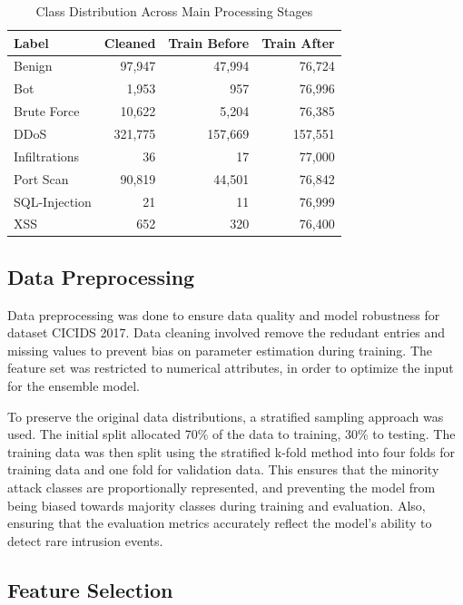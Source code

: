 \documentclass[conference,a4paper]{IEEEtran}
\begin{document}
\begin{table}[htbp]
\caption{Class Distribution Across Main Processing Stages}
\label{tab:class_dist}
\centering
\footnotesize
\renewcommand{\arraystretch}{1.15}
\setlength{\tabcolsep}{3pt}
\begin{tabular}{|l|r|r|r|}
\hline
\textbf{Label} & \textbf{Cleaned} & \textbf{Train Before} & \textbf{Train After} \\
\hline
Benign & 97,947 & 47,994 & 76,724 \\
\hline
Bot & 1,953 & 957 & 76,996 \\
\hline
Brute Force & 10,622 & 5,204 & 76,385 \\
\hline
DDoS & 321,775 & 157,669 & 157,551 \\
\hline
Infiltrations & 36 & 17 & 77,000 \\
\hline
Port Scan & 90,819 & 44,501 & 76,842 \\
\hline
SQL-Injection & 21 & 11 & 76,999 \\
\hline
XSS & 652 & 320 & 76,400 \\
\hline
\end{tabular}
\end{table}

\subsection{Data Preprocessing}

Data preprocessing was done to ensure data quality and model robustness for dataset CICIDS 2017. Data cleaning involved remove the redudant entries and missing values to prevent bias on parameter estimation during training. The feature set was restricted to numerical attributes, in order to optimize the input for the ensemble model. 

To preserve the original data distributions, a stratified sampling approach was used. The initial split allocated 70\% of the data to training, 30\% to testing. The training data was then split using the stratified k-fold method into four folds for training data and one fold for validation data. This ensures that the minority attack classes are proportionally represented, and preventing the model from being biased towards majority classes during training and evaluation. Also, ensuring that the evaluation metrics accurately reflect the model's ability to detect rare intrusion events.

\subsection{Feature Selection}
\end{document}
